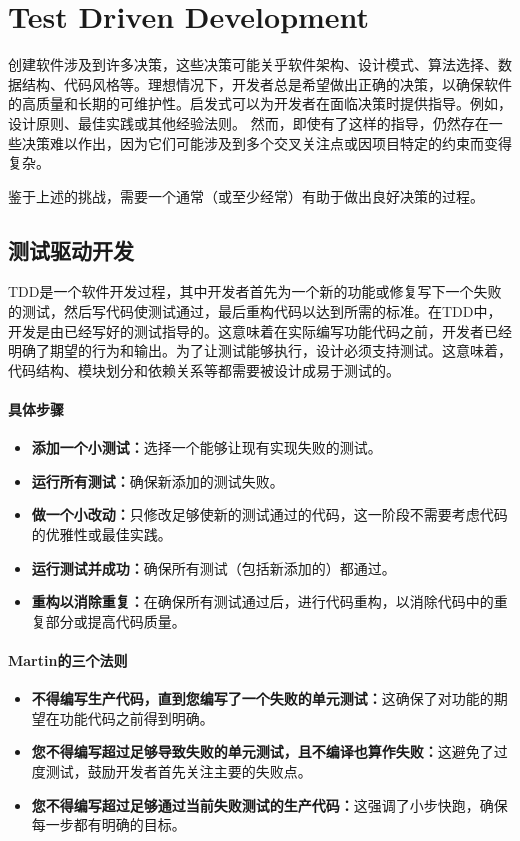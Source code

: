 \chapter{Test Driven Development}

创建软件涉及到许多决策，这些决策可能关乎软件架构、设计模式、算法选择、数据结构、代码风格等。理想情况下，开发者总是希望做出正确的决策，以确保软件的高质量和长期的可维护性。启发式可以为开发者在面临决策时提供指导。例如，设计原则、最佳实践或其他经验法则。
然而，即使有了这样的指导，仍然存在一些决策难以作出，因为它们可能涉及到多个交叉关注点或因项目特定的约束而变得复杂。

鉴于上述的挑战，需要一个通常（或至少经常）有助于做出良好决策的过程。

\section{测试驱动开发}

TDD是一个软件开发过程，其中开发者首先为一个新的功能或修复写下一个失败的测试，然后写代码使测试通过，最后重构代码以达到所需的标准。在TDD中，开发是由已经写好的测试指导的。这意味着在实际编写功能代码之前，开发者已经明确了期望的行为和输出。为了让测试能够执行，设计必须支持测试。这意味着，代码结构、模块划分和依赖关系等都需要被设计成易于测试的。

\subsubsection{具体步骤}

\begin{itemize}
	\item \textbf{添加一个小测试：}选择一个能够让现有实现失败的测试。
	\item \textbf{运行所有测试：}确保新添加的测试失败。
	\item \textbf{做一个小改动：}只修改足够使新的测试通过的代码，这一阶段不需要考虑代码的优雅性或最佳实践。
	\item \textbf{运行测试并成功：}确保所有测试（包括新添加的）都通过。
	\item \textbf{重构以消除重复：}在确保所有测试通过后，进行代码重构，以消除代码中的重复部分或提高代码质量。
\end{itemize}

\subsubsection{Martin的三个法则}

\begin{itemize}
	\item \textbf{不得编写生产代码，直到您编写了一个失败的单元测试：}这确保了对功能的期望在功能代码之前得到明确。
	\item \textbf{您不得编写超过足够导致失败的单元测试，且不编译也算作失败：}这避免了过度测试，鼓励开发者首先关注主要的失败点。
	\item \textbf{您不得编写超过足够通过当前失败测试的生产代码：}这强调了小步快跑，确保每一步都有明确的目标。
\end{itemize}


